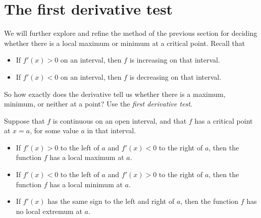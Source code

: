 \documentclass{ximera}
\begin{document}
\section{The first derivative test}

We will further explore and refine the method of the previous section for deciding whether there is a
local maximum or minimum at a critical point.
 Recall that
\begin{itemize}
\item If $f'(x) >0$ on an interval, then $f$ is increasing on that interval.
\item If $f'(x) <0$ on an interval, then $f$ is decreasing on that interval.
\end{itemize}

So how exactly does the derivative tell us whether there is a maximum,
minimum, or neither at a point? Use the \textit{first derivative test}.

\begin{theorem}\label{T:fdt}
Suppose that $f$ is continuous on an open interval, and that $f$  has a critical point
at $x=a$, for some value $a$ in that interval.
\begin{itemize}
\item If $f'(x)>0$ to the left of $a$ and $f'(x)<0$ to the right of
  $a$, then the function $f$ has a local maximum at $a$.
\item If $f'(x)<0$ to the left of $a$ and $f'(x)>0$ to the right of
  $a$, then the function $f$ has a  local minimum at $a$.
\item If $f'(x)$ has the same sign to the left and right of $a$,
  then the function $f$ has no  local extremum at $a$.
\end{itemize}
\end{theorem}
\end{document}
